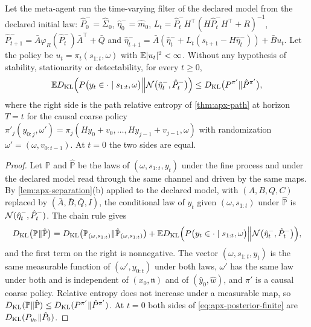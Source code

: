 \begin{proposition}\label{prop:apx-posterior-finite}
Let the meta-agent run the time-varying filter of the declared model from the declared initial law: $\hat P^-_0=\hat\Sigma_0$, $\hat\eta^-_0=\hat m_0$, $L_t=\hat P^-_tH^\top(H\hat P^-_tH^\top+R)^{-1}$, $\hat P^-_{t+1}=\bar A\varphi_R(\hat P^-_t)\bar A^\top+\bar Q$ and $\hat\eta^-_{t+1}=\bar A(\hat\eta^-_t+L_t(s_{t+1}-H\hat\eta^-_t))+\bar Bu_t$. Let the policy be $u_t=\pi_t(s_{1:t},\omega)$ with $\mathbb{E}\lvert u_t\rvert^2<\infty$. Without any hypothesis of stability, stationarity or detectability, for every $t\ge0$,
\begin{equation}\label{eq:apx-posterior-finite}
\mathbb{E}D_{\mathrm{KL}}\Bigl(P\bigl(y_t\in\cdot\mid s_{1:t},\omega\bigr)\Big\Vert\mathcal{N}\bigl(\hat\eta^-_t,\hat P^-_t\bigr)\Bigr)\le D_{\mathrm{KL}}\bigl(P^{\pi'}\Vert\hat P^{\pi'}\bigr),
\end{equation}
where the right side is the path relative entropy of \cref{thm:apx-path} at horizon $T=t$ for the causal coarse policy $\pi'_j(y_{0:j},\omega')=\pi_j(Hy_0+v_0,\dots,Hy_{j-1}+v_{j-1},\omega)$ with randomization $\omega'=(\omega,v_{0:t-1})$. At $t=0$ the two sides are equal.
\end{proposition}

\begin{proof}
Let $\mathbb P$ and $\hat{\mathbb P}$ be the laws of $(\omega,s_{1:t},y_t)$ under the fine process and under the declared model read through the same channel and driven by the same maps. By \cref{lem:apx-separation}(b) applied to the declared model, with $(A,B,Q,C)$ replaced by $(\bar A,\bar B,\bar Q,I)$, the conditional law of $y_t$ given $(\omega,s_{1:t})$ under $\hat{\mathbb P}$ is $\mathcal{N}(\hat\eta^-_t,\hat P^-_t)$. The chain rule gives
\begin{equation*}
D_{\mathrm{KL}}\bigl(\mathbb P\Vert\hat{\mathbb P}\bigr)=D_{\mathrm{KL}}\bigl(\mathbb P_{(\omega,s_{1:t})}\Vert\hat{\mathbb P}_{(\omega,s_{1:t})}\bigr)+\mathbb{E}D_{\mathrm{KL}}\Bigl(P\bigl(y_t\in\cdot\mid s_{1:t},\omega\bigr)\Big\Vert\mathcal{N}\bigl(\hat\eta^-_t,\hat P^-_t\bigr)\Bigr),
\end{equation*}
and the first term on the right is nonnegative. The vector $(\omega,s_{1:t},y_t)$ is the same measurable function of $(\omega',y_{0:t})$ under both laws, $\omega'$ has the same law under both and is independent of $(x_0,\mathfrak n)$ and of $(\hat y_0,\hat w)$, and $\pi'$ is a causal coarse policy. Relative entropy does not increase under a measurable map, so $D_{\mathrm{KL}}(\mathbb P\Vert\hat{\mathbb P})\le D_{\mathrm{KL}}(P^{\pi'}\Vert\hat P^{\pi'})$. At $t=0$ both sides of \cref{eq:apx-posterior-finite} are $D_{\mathrm{KL}}(P_{y_0}\Vert\hat P_0)$.
\end{proof}

